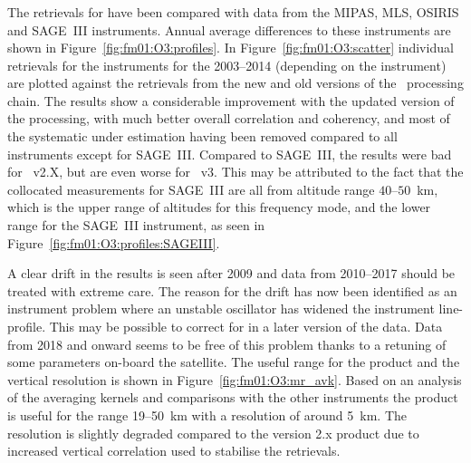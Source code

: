 \subsubsection{}
\label{sec:fm01:comparison:O3}
The retrievals for  have been compared with data from the MIPAS, MLS,
OSIRIS and SAGE~III instruments. Annual average differences to these
instruments are shown in Figure~\ref{fig:fm01:O3:profiles}. In
Figure~\ref{fig:fm01:O3:scatter} individual retrievals for the instruments for
the 2003--2014 (depending on the instrument)  are plotted against the
retrievals from the new and old versions of the \smr\ processing chain. The
results show a considerable improvement with the updated version of the
processing, with much better overall correlation and coherency, and most of the
systematic under estimation having been removed compared to all instruments
except for SAGE~III.  Compared to SAGE~III, the results were bad for \smr~v2.X,
but are even worse for \smr~v3. This may be attributed to the fact that the
collocated measurements for SAGE~III are all from altitude range $40$--$50$~km,
which is the upper range of altitudes for this frequency mode, and the lower
range for the SAGE~III instrument, as seen in
Figure~\ref{fig:fm01:O3:profiles:SAGEIII}.

A clear drift in the results is seen after 2009 and data from 2010--2017 should
be treated with extreme care. The reason for the  drift has now been identified
as an instrument problem where an unstable oscillator has widened the
instrument line-profile.  This may be possible to correct for in a later
version of the data.  Data from 2018 and onward seems to  be free of this problem
thanks to a retuning  of some parameters on-board the satellite.  The useful
range for the product and the vertical resolution is shown in
Figure~\ref{fig:fm01:O3:mr_avk}.  Based on an analysis of the averaging kernels and
comparisons with the other instruments the product is useful for the range 19--50~km
with a resolution of around 5~km. The resolution is slightly degraded compared
to the version 2.x product due to increased vertical correlation used to
stabilise the retrievals.


